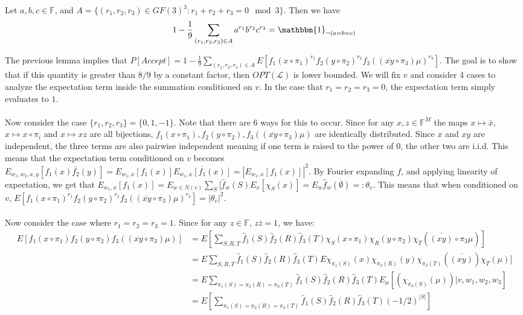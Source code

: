 \documentclass{article}
\newcommand{\1}{\mathbbm{1}}
\newcommand{\F}{\mathbb{F}}
\begin{document}
\begin{lemma}
Let $a,b,c\in \F$, and $A = \{(r_1, r_2, r_3)\in GF(3)^3: r_1 + r_2+r_3 = 0\mod 3\}$. Then we have $$1-\frac{1}{9}\sum_{(r_1,r_2,r_3)\in A}a^{r_1}b^{r_2}c^{r_3} = \1_{\neg(a=b=c)}$$
\end{lemma}
The previous lemma implies that $P[Accept] = 1-\frac{1}{9}\sum_{(r_1,r_2,r_3)\in A}E[f_1(x\circ \pi_1)^{r_1}f_2(y\circ\pi_2)^{r_2}f_3((\overline{xy}\circ \pi_3)\mu)^{r_3}]$. The goal is to show that if this quantity is greater than $8/9$ by a constant factor, then $OPT(\mathcal{L})$ is lower bounded. We will fix $v$ and consider 4 cases to analyze the expectation term inside the summation conditioned on $v$. In the case that $r_1 = r_2 = r_3 = 0$, the expectation term simply evaluates to $1$. \\\\
Now consider the case $\{r_1, r_2, r_3\} = \{0,1,-1\}$. Note that there are 6 ways for this to occur. Since for any $x,z\in \F^M$ the maps $x\mapsto \bar{x}$, $x\mapsto x\circ\pi_i$ and $x\mapsto xz$ are all bijections, $f_1(x\circ \pi_1), f_2(y\circ\pi_2), f_3((\overline{xy}\circ \pi_3)\mu)$ are identically distributed. Since $x$ and $xy$ are independent, the three terms are also pairwise independent meaning if one term is raised to the power of $0$, the other two are i.i.d. This means that the expectation term conditioned on $v$ becomes $E_{w_1, w_2,x,y}[f_1(x)\bar{f_2}(y)] = E_{w_1,x}[f_1(x)]\overline{E_{w_1,x}[f_1(x)]} = |E_{w_1,x}[f_1(x)]|^2$. By Fourier expanding $f$, and applying linearity of expectation, we get that $E_{w_1,x}[f_1(x)] = E_{w\in N(v)}\sum_{S}[\hat{f}_w(S)E_{x}[\chi_S(x)] = E_w\hat{f}_w(\emptyset) =: \theta_v$. This means that when conditioned on $v$, $E[f_1(x\circ \pi_1)^{r_1}f_2(y\circ\pi_2)^{r_2}f_3((\overline{xy}\circ \pi_3)\mu)^{r_3}] = |\theta_v|^2$.\\\\
Now consider the case where $r_1=r_2=r_3=1$. Since for any $z\in \F$, $z\bar{z} = 1$, we have:
\begin{align*}
    E[f_1(x\circ \pi_1)f_2(y\circ\pi_2)f_3((\overline{xy}\circ \pi_3)\mu)] &= E[\sum_{S,R,T }\hat{f}_1(S)\hat{f}_2(R)\hat{f}_3(T)\chi_{S}(x\circ \pi_1)\chi_{R}(y\circ\pi_2)\chi_{T}(\overline{(xy)}\circ\pi_3\mu)]\\
    &= E\sum_{S,R,T }\hat{f}_1(S)\hat{f}_2(R)\hat{f}_3(T)E\chi_{\pi_1(S)}(x)\chi_{\pi_2(R)}(y)\chi_{\pi_3(T)}(\overline{(xy)})\chi_T(\mu)]\\
    &=E\sum_{\pi_1(S)=\pi_2(R)=\pi_3(T) }\hat{f}_1(S)\hat{f}_2(R)\hat{f}_3(T)E_{\mu}[(\chi_{\pi_3(S)}(\mu))|v,w_1,w_2,w_3]\\
    &= E[\sum_{\pi_1(S)=\pi_2(R)=\pi_3(T) }\hat{f}_1(S)\hat{f}_2(R)\hat{f}_3(T)(-1/2)^{|S|}]
\end{align*}
\end{document}
